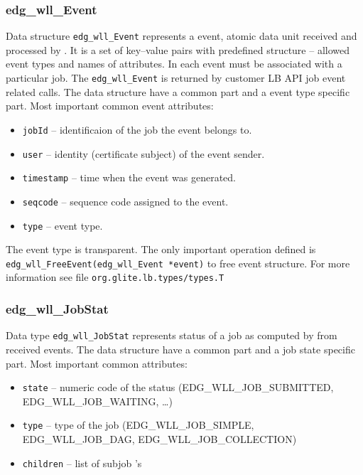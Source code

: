 \subsubsection{edg\_wll\_Event}
Data structure \texttt{edg\_wll\_Event} represents a \LB event, atomic
data unit received and processed by \LB. It is a set of key--value
pairs with predefined structure -- allowed event types and names of
attributes. In \LB each event must be associated with a particular
job. The \texttt{edg\_wll\_Event} is returned by customer LB API job
event related calls. The data structure have a common part and a event
type specific part. Most important common event attributes:
\begin{itemize}
  \item \texttt{jobId} -- identificaion of the job the event belongs to.
  \item \texttt{user} -- identity (certificate subject) of the event sender.
  \item \texttt{timestamp} -- time when the event was generated.
  \item \texttt{seqcode} -- sequence code assigned to the event.
  \item \texttt{type} -- event type.
\end{itemize}

The event type is transparent. The only important operation defined is
\texttt{edg\_wll\_FreeEvent(edg\_wll\_Event *event)} to free event
structure. For more information see file \texttt{org.glite.lb.types/types.T} 


\subsubsection{edg\_wll\_JobStat}
Data type \texttt{edg\_wll\_JobStat} represents status of a job as
computed by \LB from received events. The data structure have a common
part and a job state specific part. Most important common
attributes:
\begin{itemize}
  \item \texttt{state} -- numeric code of the status
    (EDG\_WLL\_JOB\_SUBMITTED, EDG\_WLL\_JOB\_WAITING, \dots)
  \item \texttt{type} -- type of the job (EDG\_WLL\_JOB\_SIMPLE,
    EDG\_WLL\_JOB\_DAG, EDG\_WLL\_JOB\_COLLECTION) 
  \item \texttt{children} -- list of subjob \jobid's
\end{itemize}


